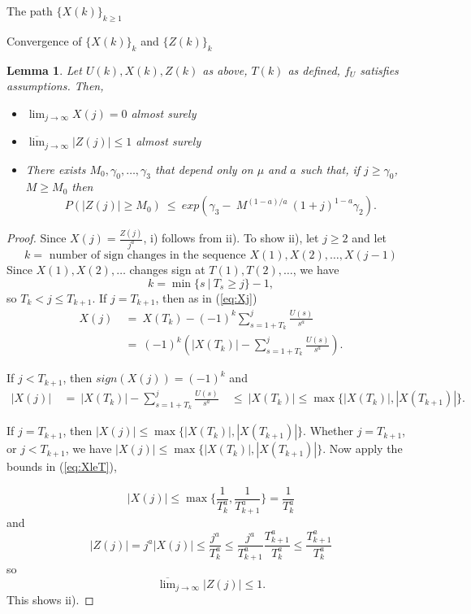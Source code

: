 \documentclass[12pt]{article}
\newtheorem{lemma}[theorem]{Lemma}
\begin{document}
\begin{section}{The path $\{X(k)\}_{k\ge1}$ }
\begin{subsection}{Convergence of $\{X(k)\}_k$ and $\{Z(k)\}_k$}


\begin{lemma} \label{lm:XZ convrgnce}
Let $U(k),X(k),Z(k)$ as above, $T(k)$ as defined, $f_U$ satisfies assumptions. Then,
\begin{itemize}
	\item[i.] $\lim_{j \rightarrow \infty } X(j) = 0$ almost surely
	\item[ii.] $\overline{ \lim}_{j \rightarrow \infty} |Z(j)| \le 1$ almost surely
	\item[iii.] There exists $M_0, \gamma_0, \dots, \gamma_3$ that depend only on $\mu$ and $a$ such that, if $j \ge \gamma_0$, $M \ge M_0$  then
	\begin{equation*}
	P(|Z(j)| \ge M_0) ~\le~ exp(\gamma_3 - \ M^{(1-a)/a} \ (1+j)^{1-a} \gamma_2  ).
	\end{equation*}
\end{itemize}
\end{lemma}

\begin{proof} Since $X(j) = \frac{Z(j)}{j^a}$, i) follows from ii). To show ii), let $j\ge 2$ and let 
	$$
	k = \text{ number of sign changes in the sequence } X(1),X(2),\dots,X(j-1)
	$$
Since $X(1),X(2),\dots$ changes sign at $T(1),T(2),\dots$, we have 
	$$
	k = \min\{s\ |\ T_s\ge j\} - 1 ,
	$$
so $T_{k} < j \le T_{k+1}$.	
If $j=T_{k+1}$, then as in (\ref{eq:Xj})
\begin{align*}
X(j) &~=~ X(T_{k}) - (-1)^k \sum_{s=1+T_{k}}^{j} \frac{U(s)}{s^a} \\
  &~=~ (-1)^{k} \left( |X(T_{k})| - \sum_{s=1+T_{k}}^{j} \frac{U(s)}{s^a} \right).
\end{align*}

If $j < T_{k+1}$, then $sign(X(j)) = (-1)^k$ and 
\begin{align*}
|X(j)| &~=~ |X(T_{k})| - \sum_{s=1+T_{k}}^{j} \frac{U(s)}{s^a} 
   & ~\le~ |X(T_{k})| \le \max \{|X(T_{k})|, |X(T_{k+1})|\}.
\end{align*}

If $j = T_{k+1}$, then $|X(j)| \le \max \{|X(T_{k})|, |X(T_{k+1})|\}$. 
Whether $j=T_{k+1}$, or $j < T_{k+1}$, we have $|X(j)| \le \max \{|X(T_{k})|, |X(T_{k+1})|\}$. Now apply the bounds in (\ref{eq:XleT}), 

$$
|X(j)| \le 
\max \{ 
		\frac{1}{T_{k}^a} , 
		\frac{1}{T_{k+1}^a} \} 
		= \frac{1}{T_{k}^a} 
$$
and
\begin{equation} \label{eq:ZndTs}
|Z(j)| = j^a|X(j)| \le \frac{j^a}{T_{k}^a} \le \frac{j^a}{T_{k+1}^a} \frac{T_{k+1}^a}{T_{k}^a} \le \frac{T_{k+1}^a}{T_{k}^a}
\end{equation}
so
$$
\overline{ \lim}_{j \rightarrow \infty} |Z(j)| \le 1.
$$ This shows ii).


\end{proof}
\end{subsection}
\end{section}
\end{document}
